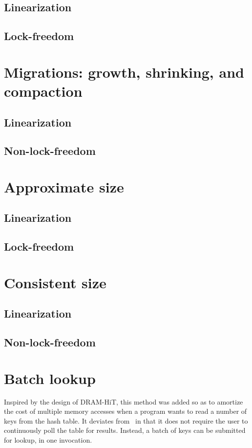 \subsection{Linearization}
\subsection{Lock-freedom}

\section{Migrations: growth, shrinking, and compaction}
\subsection{Linearization}
\subsection{Non-lock-freedom}

\section{Approximate size}
\subsection{Linearization}
\subsection{Lock-freedom}

\section{Consistent size}
\subsection{Linearization}
\subsection{Non-lock-freedom}

\section{Batch lookup}

Inspired by the design of DRAM-HiT, this method was added so as to amortize the cost of multiple memory accesses when a program wants to read a number of keys from the hash table.
It deviates from~\cite{dramhit} in that it does not require the user to continuously poll the table for results.
Instead, a batch of keys can be submitted for lookup, in one invocation.

